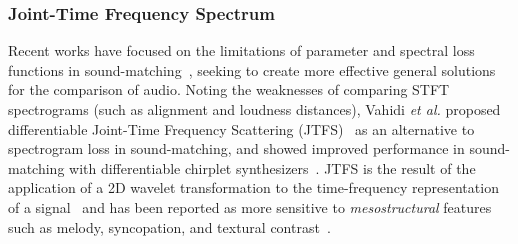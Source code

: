 
\subsubsection{Joint-Time Frequency Spectrum}
Recent works have focused on the limitations of parameter and spectral loss functions in sound-matching~\cite{vahidi2023mesostructures,uzrad2024diffmoog}, seeking to create more effective general solutions for the comparison of audio. 
Noting the weaknesses of comparing STFT spectrograms (such as alignment and loudness distances), Vahidi \textit{et al.} proposed differentiable Joint-Time Frequency Scattering (\gls{JTFS})~\cite{anden2015joint} as an alternative to spectrogram loss in sound-matching, and showed improved performance in sound-matching with differentiable chirplet synthesizers~\cite{vahidi2023mesostructures}. JTFS is the result of the application of a 2D wavelet transformation to the time-frequency representation of a signal~\cite{anden2015joint} and has been reported as more sensitive to \textit{mesostructural} features such as melody, syncopation, and textural
contrast~\cite{vahidi2023mesostructures}.



